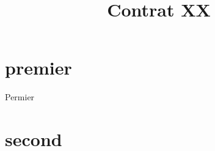 \documentclass[defaultorg]{organisation-contract}
\title{Contrat XX}
\begin{document}
\chapeau{}

\section{premier}
Permier

\section{second}
\lipsum

\signatures{}
\end{document}
